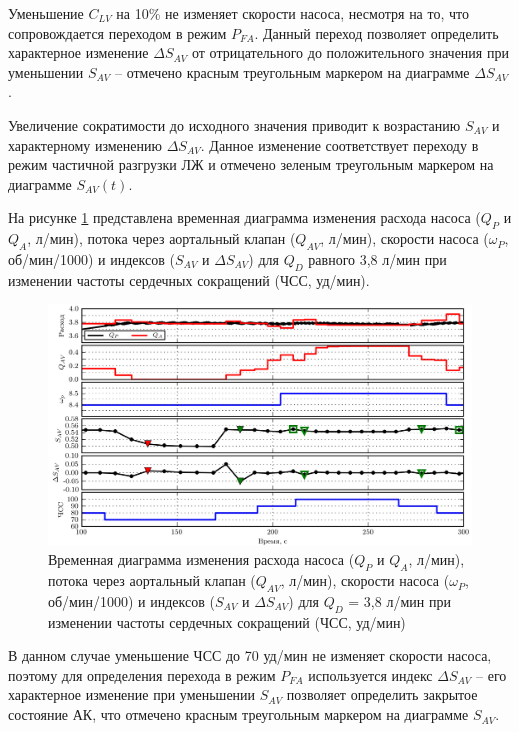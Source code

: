 Уменьшение $C_{LV}$ на 10\% не изменяет скорости насоса, несмотря на то, что сопровождается переходом в режим $P_{FA}$. Данный переход позволяет определить характерное изменение $\Delta S_{AV}$ от отрицательного до положительного значения при уменьшении $S_{AV}$ -- отмечено красным треугольным маркером на диаграмме $\Delta S_{AV}$.

Увеличение сократимости до исходного значения приводит к возрастанию $S_{AV}$ и характерному изменению $\Delta S_{AV}$. Данное изменение соответствует переходу в режим частичной разгрузки ЛЖ и отмечено зеленым треугольным маркером на диаграмме $S_{AV}(t)$. 

На рисунке \ref{img:waveform_hr_variation} представлена временная диаграмма изменения расхода насоса ($Q_P$ и $Q_A$, л/мин), потока через аортальный клапан ($Q_{AV}$, л/мин), скорости насоса ($\omega_P$, об/мин/1000) и индексов ($S_{AV}$ и $\Delta S_{AV}$) для $Q_D$ равного 3,8 л/мин при изменении частоты сердечных сокращений (ЧСС, уд/мин). 

\begin{figure}[ht] 
  \center
  \includegraphics [scale=1.0] {../images/c3_waveform_hr_variation}
  \caption{Временная диаграмма изменения расхода насоса ($Q_P$ и $Q_A$, л/мин), потока через аортальный клапан ($Q_{AV}$, л/мин), скорости насоса ($\omega_P$, об/мин/1000) и индексов ($S_{AV}$ и $\Delta S_{AV}$) для $Q_D$ = 3,8 л/мин при изменении частоты сердечных сокращений (ЧСС, уд/мин)} 
  \label{img:waveform_hr_variation}  
\end{figure}

В данном случае уменьшение ЧСС до 70 уд/мин не изменяет скорости насоса, поэтому для определения перехода в режим $P_{FA}$ используется индекс $\Delta S_{AV}$ -- его характерное изменение при уменьшении $S_{AV}$ позволяет определить закрытое состояние АК, что отмечено красным треугольным маркером на диаграмме $S_{AV}$. 

